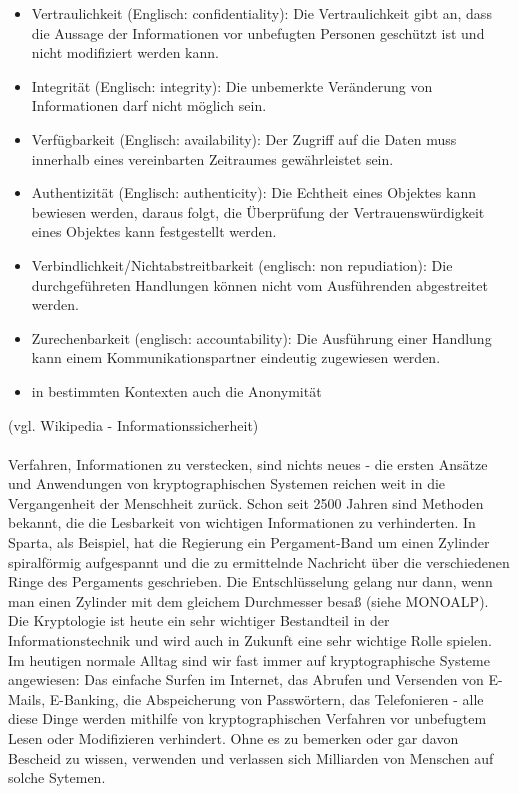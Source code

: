 \documentclass[12pt,a4paper]{report}
\begin{document}
\begin{itemize}
\item Vertraulichkeit (Englisch: confidentiality): Die Vertraulichkeit gibt an, dass die Aussage der Informationen vor unbefugten Personen geschützt ist und nicht modifiziert werden kann.
\item Integrität (Englisch: integrity): Die unbemerkte Veränderung von Informationen darf nicht möglich sein.
\item Verfügbarkeit (Englisch: availability): Der Zugriff auf die Daten muss innerhalb eines vereinbarten Zeitraumes gewährleistet sein.
\item Authentizität (Englisch: authenticity): Die Echtheit eines Objektes kann bewiesen werden, daraus folgt, die Überprüfung der Vertrauenswürdigkeit eines Objektes kann festgestellt werden.
\item Verbindlichkeit/Nichtabstreitbarkeit (englisch: non repudiation): Die durchgeführeten Handlungen können nicht vom Ausführenden abgestreitet werden.
\item Zurechenbarkeit (englisch: accountability): Die Ausführung einer Handlung kann einem Kommunikationspartner eindeutig zugewiesen werden.
\item in bestimmten Kontexten auch die Anonymität
\end{itemize}

(vgl. Wikipedia - Informationssicherheit)\\\\

Verfahren, Informationen zu verstecken, sind nichts neues - die ersten Ansätze und Anwendungen von kryptographischen Systemen reichen weit in die Vergangenheit der Menschheit zurück. Schon seit 2500 Jahren sind Methoden bekannt, die die Lesbarkeit von wichtigen Informationen zu verhinderten. In Sparta, als Beispiel, hat die Regierung ein Pergament-Band um einen Zylinder spiralförmig aufgespannt und die zu ermittelnde Nachricht über die verschiedenen Ringe des Pergaments geschrieben. Die Entschlüsselung gelang nur dann, wenn man einen Zylinder mit dem gleichem Durchmesser besaß (siehe MONOALP).\\

Die Kryptologie ist heute ein sehr wichtiger Bestandteil in der Informationstechnik und wird auch in Zukunft eine sehr wichtige Rolle spielen. Im heutigen normale Alltag sind wir fast immer auf kryptographische Systeme angewiesen: Das einfache Surfen im Internet, das Abrufen und Versenden von E-Mails, E-Banking, die Abspeicherung von Passwörtern, das Telefonieren - alle diese Dinge werden mithilfe von kryptographischen Verfahren vor unbefugtem Lesen oder Modifizieren verhindert. Ohne es zu bemerken oder gar davon Bescheid zu wissen, verwenden und verlassen sich Milliarden von Menschen auf solche Sytemen.
\end{document}
